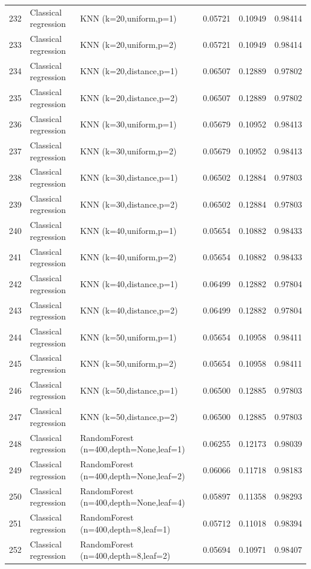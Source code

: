 \documentclass[10pt]{article}
\begin{document}
\begin{longtable}{C{0.75cm}L{2.35cm}L{8.0cm}C{1.15cm}C{1.15cm}C{1.15cm}}
232 & Classical regression & KNN (k=20,uniform,p=1) & 0.05721 & 0.10949 & 0.98414 \\
233 & Classical regression & KNN (k=20,uniform,p=2) & 0.05721 & 0.10949 & 0.98414 \\
234 & Classical regression & KNN (k=20,distance,p=1) & 0.06507 & 0.12889 & 0.97802 \\
235 & Classical regression & KNN (k=20,distance,p=2) & 0.06507 & 0.12889 & 0.97802 \\
236 & Classical regression & KNN (k=30,uniform,p=1) & 0.05679 & 0.10952 & 0.98413 \\
237 & Classical regression & KNN (k=30,uniform,p=2) & 0.05679 & 0.10952 & 0.98413 \\
238 & Classical regression & KNN (k=30,distance,p=1) & 0.06502 & 0.12884 & 0.97803 \\
239 & Classical regression & KNN (k=30,distance,p=2) & 0.06502 & 0.12884 & 0.97803 \\
240 & Classical regression & KNN (k=40,uniform,p=1) & 0.05654 & 0.10882 & 0.98433 \\
241 & Classical regression & KNN (k=40,uniform,p=2) & 0.05654 & 0.10882 & 0.98433 \\
242 & Classical regression & KNN (k=40,distance,p=1) & 0.06499 & 0.12882 & 0.97804 \\
243 & Classical regression & KNN (k=40,distance,p=2) & 0.06499 & 0.12882 & 0.97804 \\
244 & Classical regression & KNN (k=50,uniform,p=1) & 0.05654 & 0.10958 & 0.98411 \\
245 & Classical regression & KNN (k=50,uniform,p=2) & 0.05654 & 0.10958 & 0.98411 \\
246 & Classical regression & KNN (k=50,distance,p=1) & 0.06500 & 0.12885 & 0.97803 \\
247 & Classical regression & KNN (k=50,distance,p=2) & 0.06500 & 0.12885 & 0.97803 \\
248 & Classical regression & RandomForest (n=400,depth=None,leaf=1) & 0.06255 & 0.12173 & 0.98039 \\
249 & Classical regression & RandomForest (n=400,depth=None,leaf=2) & 0.06066 & 0.11718 & 0.98183 \\
250 & Classical regression & RandomForest (n=400,depth=None,leaf=4) & 0.05897 & 0.11358 & 0.98293 \\
251 & Classical regression & RandomForest (n=400,depth=8,leaf=1) & 0.05712 & 0.11018 & 0.98394 \\
252 & Classical regression & RandomForest (n=400,depth=8,leaf=2) & 0.05694 & 0.10971 & 0.98407 \\

\end{longtable}
\end{document}
